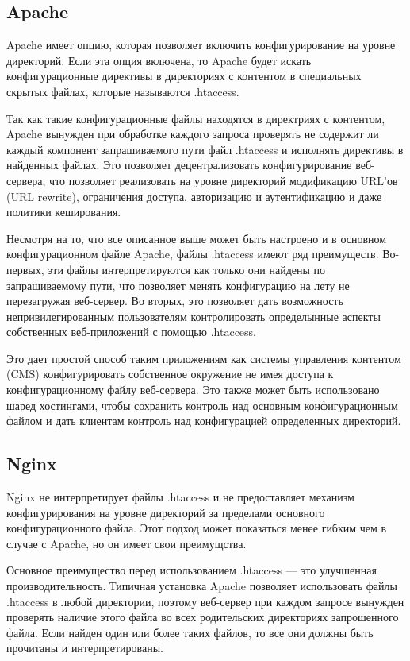 \documentclass[14pt, a4paper]{article}
\begin{document}
\subsection*{Apache}
Apache имеет опцию, которая позволяет включить конфигурирование на уровне директорий. 
Если эта опция включена, то Apache будет искать конфигурационные директивы в директориях 
с контентом в специальных скрытых файлах, которые называются .htaccess.


Так как такие конфигурационные файлы находятся в директриях с контентом, Apache вынужден 
при обработке каждого запроса проверять не содержит ли каждый компонент запрашиваемого пути 
файл .htaccess и исполнять директивы в найденных файлах. Это позволяет децентрализовать 
конфигурирование веб-сервера, что позволяет реализовать на уровне директорий модификацию 
URL'ов (URL rewrite), ограничения доступа, авторизацию и аутентификацию и даже политики кеширования.


Несмотря на то, что все описанное выше может быть настроено и в основном конфигурационном файле 
Apache, файлы .htaccess имеют ряд преимуществ. Во-первых, эти файлы интерпретируются как 
только они найдены по запрашиваемому пути, что позволяет менять конфигурацию на лету не 
перезагружая веб-сервер. Во вторых, это позволяет дать возможность непривилегированным 
пользователям контролировать определынные аспекты собственных веб-приложений с помощью .htaccess.


Это дает простой способ таким приложениям как системы управления контентом 
(CMS) конфигурировать собственное окружение не имея доступа к конфигурационному файлу 
веб-сервера. Это также может быть использовано шаред хостингами, чтобы сохранить контроль 
над основным конфигурационным файлом и дать клиентам контроль над конфигурацией определенных директорий.

\subsection*{Nginx}

Nginx не интерпретирует файлы .htaccess и не предоставляет механизм конфигурирования 
на уровне директорий за пределами основного конфигурационного файла. Этот подход 
может показаться менее гибким чем в случае с Apache, но он имеет свои преимущства.


Основное преимущество перед использованием .htaccess — это улучшенная производительность.
Типичная установка Apache позволяет использовать файлы .htaccess в любой директории, 
поэтому веб-сервер при каждом запросе вынужден проверять наличие этого файла во всех 
родительских директориях запрошенного файла. Если найден один или более таких файлов, 
то все они должны быть прочитаны и интерпретированы.
\end{document}
